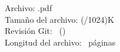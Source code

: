 
\vspace{24pt}
\ttfamily
\noindent Archivo: \jobname.pdf \\
Tamaño del archivo: \the\numexpr(/1024)K \\
Revisión Git: \texttt{\gitrevision}~(\texttt{\branch})\\
Longitud del archivo: \the\numexpr\value{page}~páginas%